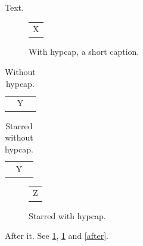 \documentclass{article}
\begin{document}
Text.
\begin{figure}[h]
\centering
\begin{tabular}{c}X\end{tabular}
\caption[Short title]{With hypcap, a short caption.}
\label{fig:a}
\end{figure}
\begin{table}[h]
\caption[Its short title]{Without hypcap.}
\label{tab:a}
\begin{tabular}{c}Y\end{tabular}
\end{table}
\begin{table}[h]
\begin{tabular}{c}Y\end{tabular}
\caption*{Starred without hypcap.}
\end{table}
\begin{figure}[h]
\begin{tabular}{c}Z\end{tabular}
\caption*{Starred with hypcap.}
\end{figure}
After it\label{after}. See \ref{fig:a}, \ref{tab:a} and \ref{after}.
\end{document}
